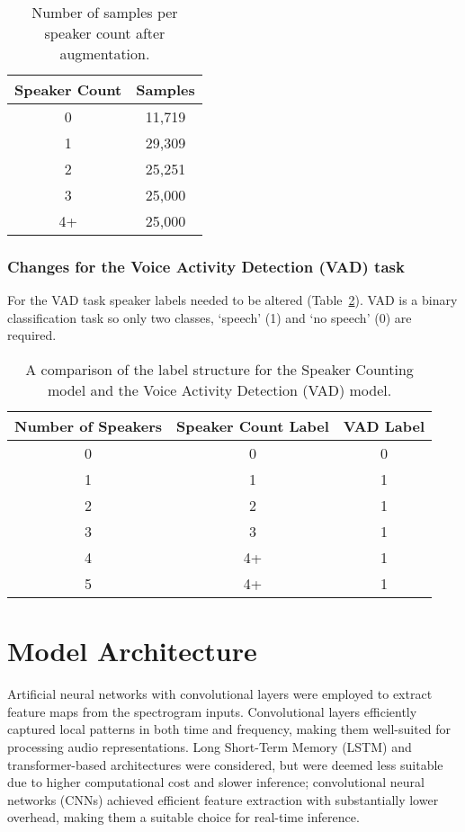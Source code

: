 \begin{table}[H]
  \centering
  \caption{Number of samples per speaker count after augmentation.}
  \label{tab:samples_aug}
  \begin{tabular}{|c|c|}
    \hline
    \textbf{Speaker Count} & \textbf{Samples} \\
    \hline
    0 & 11,719 \\
    \hline
    1 & 29,309 \\
    \hline
    2 & 25,251 \\
    \hline
    3 & 25,000 \\
    \hline
    4+ & 25,000 \\
    \hline
  \end{tabular}
\end{table}

\subsubsection{Changes for the Voice Activity Detection (VAD) task}
\label{sec:vad_labels}
For the VAD task speaker labels needed to be altered (Table~\ref{tab:VAD_data_change}). VAD is a binary classification task so only two classes, `speech' (1) and `no speech' (0) are required.

\begin{table}[H]
\centering
\caption{A comparison of the label structure for the Speaker Counting model and the Voice Activity Detection (VAD) model.}
\label{tab:VAD_data_change}
\begin{tabular}{|c|c|c|}
\hline
\textbf{Number of Speakers} & \textbf{Speaker Count Label} & \textbf{VAD Label} \\
\hline
0 & 0 & 0\\
\hline
1 & 1 & 1\\
\hline
2 & 2 & 1 \\
\hline
3 & 3 & 1 \\
\hline
4 & 4+ & 1 \\
\hline
5 & 4+ & 1 \\
\hline
\end{tabular}
\end{table}


\section{Model Architecture}
Artificial neural networks with convolutional layers were employed to extract feature maps from the spectrogram inputs. Convolutional layers efficiently captured local patterns in both time and frequency, making them well-suited for processing audio representations. Long Short-Term Memory (LSTM) and transformer-based architectures were considered, but were deemed less suitable due to higher computational cost and slower inference; convolutional neural networks (CNNs) achieved efficient feature extraction with substantially lower overhead, making them a suitable choice for real-time inference.

